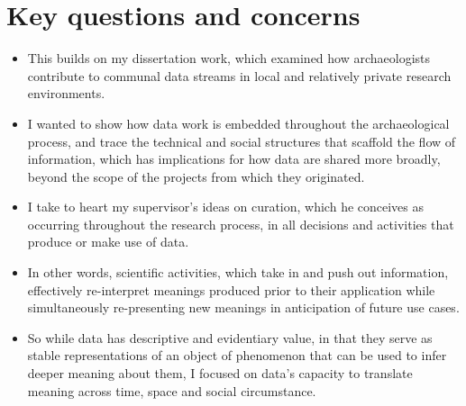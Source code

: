 \documentclass{article}
\begin{document}
\section{Key questions and concerns}
\begin{itemize}
  \item This builds on my dissertation work, which examined how archaeologists contribute to communal data streams in local and relatively private research environments.
  \item I wanted to show how data work is embedded throughout the archaeological process, and trace the technical and social structures that scaffold the flow of information, which has implications for how data are shared more broadly, beyond the scope of the projects from which they originated.
  \item I take to heart my supervisor's ideas on curation, which he conceives as occurring throughout the research process, in all decisions and activities that produce or make use of data.
  \item In other words, scientific activities, which take in and push out information, effectively re-interpret meanings produced prior to their application while simultaneously re-presenting new meanings in anticipation of future use cases.
  \item So while data has descriptive and evidentiary value, in that they serve as stable representations of an object of phenomenon that can be used to infer deeper meaning about them, I focused on data’s capacity to translate meaning across time, space and social circumstance.
\end{itemize}
\end{document}
